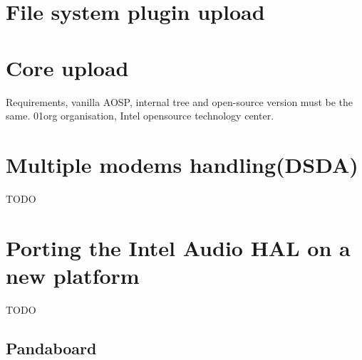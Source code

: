 \section{File system plugin upload}

\section{Core upload}
Requirements, vanilla AOSP, internal tree and open-source version must be the
same.
01org organisation, Intel opensource technology center.

\section{Multiple modems handling(DSDA)}
TODO

\section{Porting the Intel Audio HAL on a new platform}
TODO
\subsection{Pandaboard}

